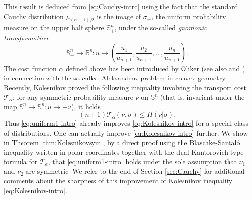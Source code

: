 \documentclass[10pt]{amsart}
\theoremstyle{definition}
\theoremstyle{remark}
\newcommand{\R}{\mathbb{R}}
\newcommand{\Sd}{\mathbb{S}}
\begin{document}
This result is deduced from \eqref{eq:Cauchy-intro} using the fact that the standard Cauchy distribution $\mu_{(n+1)/2}$ is the image of $\sigma_+$, the uniform probability measure on the upper half sphere $\Sd^n_+$, under the so-called \emph{gnomonic transformation}:
\[
\Sd^n_+ \to \R^n : u \mapsto \left(\frac{u_1}{u_{n+1}}, \frac{u_2}{u_{n+1}},\ldots, \frac{u_n}{u_{n+1}} \right).
\]
The cost function $\alpha$ defined above has been introduced by Oliker \cite{Olik07} (see also \cite{Ber16} and \cite{Kol20}) in connection with the so-called Aleksandrov problem in convex geometry. Recently, Kolesnikov \cite{Kol20} proved the following inequality involving the transport cost $\mathcal{T}_\alpha$: for any symmetric probability measure $\nu$ on $\Sd^n$ (that is, invariant under the map $\Sd^n \to \Sd^n:u\mapsto -u$), it holds
\begin{equation}\label{eq:Kolesnikov-intro}
(n+1)\mathcal{T}_\alpha(\nu,\sigma) \leq H(\nu|\sigma).
\end{equation}
Thus \eqref{eq:uniform1-intro} already improves \eqref{eq:Kolesnikov-intro} for a special class of distributions. One can actually improve \eqref{eq:Kolesnikov-intro} further. We show in Theorem \ref{thm:Kolesnikovsym}, by a direct proof using the Blaschke-Santal\'o inequality written in polar coordinates together with the dual Kantorovich type formula for $\mathcal{T}_\alpha$, that \eqref{eq:uniform1-intro} holds under the sole assumption that $\nu_1$ and $\nu_2$ are symmetric. We refer to the end of Section \ref{sec:Cauchy} for additional comments about the sharpness of this improvement of Kolesnikov inequality \eqref{eq:Kolesnikov-intro}.
\end{document}
